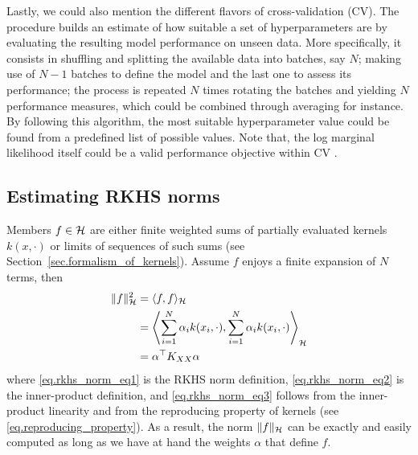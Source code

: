 Lastly, we could also mention the different flavors of cross-validation (CV). The procedure builds an estimate of how suitable a set of hyperparameters are by evaluating the resulting model performance on unseen data. More specifically, it consists in shuffling and splitting the available data into batches, say $N$; making use of $N-1$ batches to define the model and the last one to assess its performance; the process is repeated $N$ times rotating the batches and yielding $N$ performance measures, which could be combined through averaging for instance. By following this algorithm, the most suitable hyperparameter value could be found from a predefined list of possible values. Note that, the log marginal likelihood itself could be a valid performance objective within CV \citep[§5.4.2]{williams2006gaussian}.

\subsection{Estimating RKHS norms}

Members $f \in \mathcal{H}$ are either finite weighted sums of partially evaluated kernels $k(x,\cdot)$ or limits of sequences of such sums (see Section~\ref{sec.formalism_of_kernels}). Assume $f$ enjoys a finite expansion of $N$ terms, then
\begin{align}
	\Vert f \Vert_{\mathcal{H}}^2 &= \langle f, f \rangle_{\mathcal{H}} \label{eq.rkhs_norm_eq1} \\
	&= \left\langle \sum_{i=1}^N \alpha_i k(x_i,\cdot), \sum_{i=1}^N \alpha_i k(x_i,\cdot) \right\rangle_{\mathcal{H}} \label{eq.rkhs_norm_eq2} \\
	&= \alpha^\top K_{XX} \alpha \label{eq.rkhs_norm_eq3}
\end{align}
where \eqref{eq.rkhs_norm_eq1} is the RKHS norm definition, \eqref{eq.rkhs_norm_eq2} is the inner-product definition, and \eqref{eq.rkhs_norm_eq3} follows from the inner-product linearity and from the reproducing property of kernels (see \eqref{eq.reproducing_property}). As a result, the norm $\Vert f \Vert_{\mathcal{H}}$ can be exactly and easily computed as long as we have at hand the weights $\alpha$ that define $f$.

